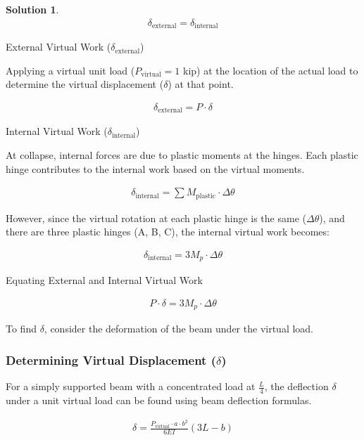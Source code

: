\documentclass[12pt]{article}
\theoremstyle{definition} %
\newtheorem{solution}{Solution}
\theoremstyle{plain} %
\begin{document}
\begin{solution}
\begin{align}
\delta_{\text{external}} = \delta_{\text{internal}}
\end{align}

{External Virtual Work ($ \delta_{\text{external}} $)}

Applying a virtual unit load ($ P_{\text{virtual}} = 1 $ kip) at the location of the actual load to determine the virtual displacement ($ \delta $) at that point.

\begin{align}
\delta_{\text{external}} = P \cdot \delta
\end{align}

{Internal Virtual Work ($ \delta_{\text{internal}} $)}

At collapse, internal forces are due to plastic moments at the hinges. Each plastic hinge contributes to the internal work based on the virtual moments.

\begin{align}
\delta_{\text{internal}} = \sum M_{\text{plastic}} \cdot \Delta \theta
\end{align}

However, since the virtual rotation at each plastic hinge is the same ($ \Delta \theta $), and there are three plastic hinges (A, B, C), the internal virtual work becomes:

\begin{align}
\delta_{\text{internal}} = 3 M_p \cdot \Delta \theta
\end{align}

{Equating External and Internal Virtual Work}

\begin{align}
P \cdot \delta = 3 M_p \cdot \Delta \theta
\end{align}

To find $ \delta $, consider the deformation of the beam under the virtual load.

\subsubsection*{Determining Virtual Displacement ($ \delta $)}

For a simply supported beam with a concentrated load at $ \frac{L}{4} $, the deflection $ \delta $ under a unit virtual load can be found using beam deflection formulas.

\begin{align}
\delta = \frac{P_{\text{virtual}} \cdot a \cdot b^2}{6 E I} \left( 3L - b \right)
\end{align}


\end{solution}
\end{document}
